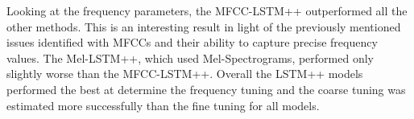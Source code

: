 Looking at the frequency parameters, the MFCC-LSTM++ outperformed all the other methods. This is an interesting result in light of the previously mentioned issues identified with MFCCs and their ability to capture precise frequency values. The Mel-LSTM++, which used Mel-Spectrograms, performed only slightly worse than the MFCC-LSTM++. Overall the LSTM++ models performed the best at determine the frequency tuning and the coarse tuning was estimated more successfully than the fine tuning for all models.





